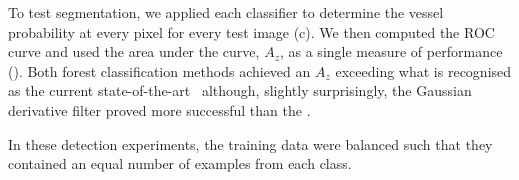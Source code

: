 \label{s:exp_retinogram_detection}
To test segmentation, we applied each classifier to determine the vessel probability at every pixel for every test image (c). We then computed the ROC curve and used the area under the curve, $A_z$, as a single measure of performance (). Both forest classification methods achieved an $A_z$ exceeding what is recognised as the current state-of-the-art~\cite{Staal_etal_TMI04} although, slightly surprisingly, the Gaussian derivative filter proved more successful than the \dtcwt{}.

In these detection experiments, the training data were balanced such that they contained an equal number of examples from each class.


